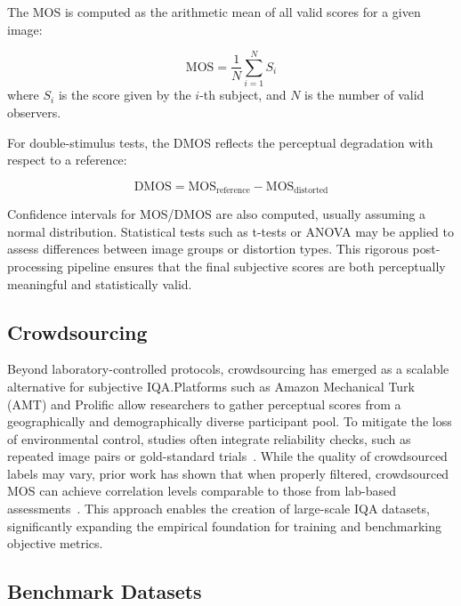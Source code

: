 The MOS is computed as the arithmetic mean of all valid scores for a given image:

\begin{equation}
\text{MOS} = \frac{1}{N} \sum_{i=1}^{N} S_i
\end{equation}
where $S_i$ is the score given by the $i$-th subject, and $N$ is the number of valid observers.

For double-stimulus tests, the DMOS reflects the perceptual degradation with respect to a reference:

\begin{equation}
\text{DMOS} = \text{MOS}_{\text{reference}} - \text{MOS}_{\text{distorted}}
\end{equation}

Confidence intervals for MOS/DMOS are also computed, usually assuming a normal distribution. Statistical tests such as t-tests or ANOVA may be applied to assess differences between image groups or distortion types. This rigorous post-processing pipeline ensures that the final subjective scores are both perceptually meaningful and statistically valid.


\subsection{Crowdsourcing}\label{sec:crowdsourcing}

Beyond laboratory-controlled protocols, crowdsourcing has emerged as a scalable alternative for subjective IQA.\@ Platforms such as Amazon Mechanical Turk (AMT) and Prolific allow researchers to gather perceptual scores from a geographically and demographically diverse participant pool. To mitigate the loss of environmental control, studies often integrate reliability checks, such as repeated image pairs or gold-standard trials~\cite{mos2016}. While the quality of crowdsourced labels may vary, prior work has shown that when properly filtered, crowdsourced MOS can achieve correlation levels comparable to those from lab-based assessments~\cite{jin2020pipal}. This approach enables the creation of large-scale IQA datasets, significantly expanding the empirical foundation for training and benchmarking objective metrics.

\subsection{Benchmark Datasets}\label{sec:benchmark_datasets}

